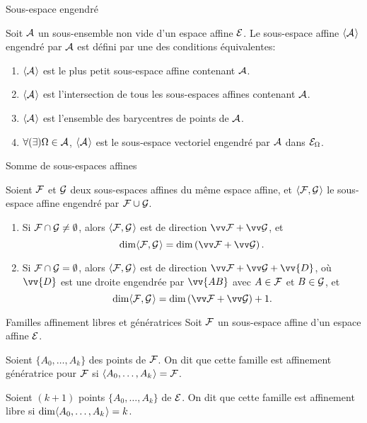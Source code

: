 \documentclass{m53beamer}
\begin{document}
  \begin{frame}{Sous-espace engendré}
    \begin{defprop}
      Soit $\mathcal{A}$ un sous-ensemble non vide d'un espace affine $\mathcal{E}$. Le sous-espace affine $\langle{\mathcal{A}}\kern.07em\rangle$ engendré par $\mathcal{A}$ est défini par une des conditions équivalentes:
        \begin{enumerate}[<+(1)->]
          \item $\langle{\mathcal{A}}\kern.07em\rangle$ est le plus petit sous-espace affine contenant $\mathcal{A}$.
          \item $\langle{\mathcal{A}}\kern.07em\rangle$ est l'intersection de tous les sous-espaces affines contenant $\mathcal{A}$.
          \item $\langle{\mathcal{A}}\kern.07em\rangle$ est l'ensemble des barycentres de points de $\mathcal{A}$.
          \item $\forall(\exists) \Omega \in \mathcal{A}$, $\langle{\mathcal{A}}\kern.07em\rangle$ est le sous-espace vectoriel engendré par $\mathcal{A}$ dans $\mathcal{E}_{\Omega}$.
        \end{enumerate}
    \end{defprop}
  \end{frame}
  \begin{frame}{Somme de sous-espaces affines}
    \begin{proposition}
      Soient $\mathcal{F}$ et $\mathcal{G}$ deux sous-espaces affines du même espace affine, et $\langle{\mathcal{F},\mathcal{G}}\kern.07em\rangle$ le sous-espace affine engendré par $\mathcal{F} \cup \mathcal{G}$.
      \begin{enumerate}[<+(1)->]
        \item Si $\mathcal{F} \cap \mathcal{G} \neq \emptyset$, alors $\langle{\mathcal{F},\mathcal{G}}\kern.07em\rangle$ est de direction $\ev{F}+\ev{G}$\pause, et
            $$
              \dim\affspan{\ens{F},\ens{G}} = \dim \left(\ev{F}+\ev{G}\right).
            $$
        \item Si $\mathcal{F} \cap \mathcal{G} = \emptyset$, alors $\langle{\mathcal{F},\mathcal{G}}\kern.07em\rangle$ est de direction $\ev{F}+\ev{G}+\vv{D}$, où $\vv{D}$ est une droite engendrée par $\vv{AB}$ avec $A \in \mathcal{F}$ et $B \in \mathcal{G}$\pause, et
            $$
              \dim\affspan{\ens{F},\ens{G}} = \dim \left(\ev{F}+\ev{G}\right)+1.
            $$
      \end{enumerate}
    \end{proposition}
  \end{frame}
  \begin{frame}{Familles affinement libres et génératrices}
    Soit $\mathcal{F}$ un sous-espace affine d'un espace affine $\mathcal{E}$.\pause
    \begin{definition}
      Soient $\{A_{0},\ldots,A_{k}\}$ des points de $\mathcal{F}$. On dit que cette famille est \alert{affinement génératrice} pour $\mathcal{F}$ si $\langle{A_{0},\ldots,A_{k}}\kern.07em\rangle=\mathcal{F}$.
    \end{definition}\pause
    \begin{definition}
      Soient $(k+1)$ points $\{A_{0},\ldots,A_{k}\}$ de $\mathcal{E}$. On dit que cette famille est \alert{affinement libre} si $\dim\langle{A_{0},\ldots,A_{k}}\kern.07em\rangle=k$.
    \end{definition}
  \end{frame}
\end{document}
